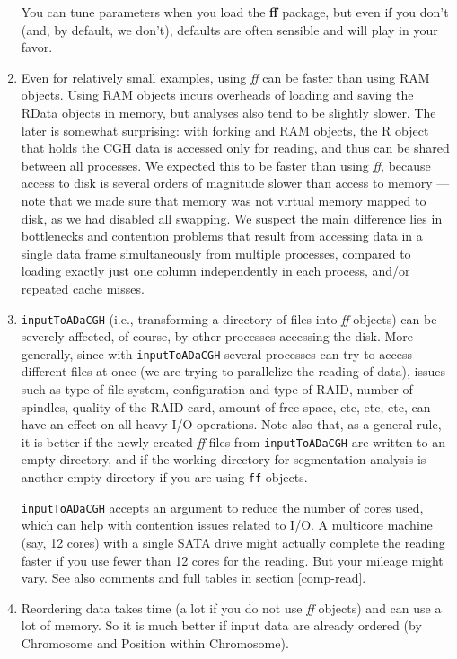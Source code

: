 \documentclass[a4paper,11pt]{article}
\begin{document}
\begin{enumerate}
  You can tune parameters when you load the \textbf{ff} package, but even
  if you don't (and, by default, we don't), defaults are often sensible
  and will play in your favor.
  
\item Even for relatively small examples, using \textit{ff} can be faster
  than using RAM objects. Using RAM objects incurs overheads of loading
  and saving the RData objects in memory, but analyses also tend to be
  slightly slower. The later is somewhat surprising: with forking and RAM
  objects, the R object that holds the CGH data is accessed only for
  reading, and thus can be shared between all processes. We expected this
  to be faster than using \textit{ff}, because access to disk is several
  orders of magnitude slower than access to memory ---note that we made
  sure that memory was not virtual memory mapped to disk, as we had
  disabled all swapping. We suspect the main difference lies in
  bottlenecks and contention problems that result from accessing data in a
  single data frame simultaneously from multiple processes, compared to
  loading exactly just one column independently in each process, and/or
  repeated cache misses.
  
  
\item \texttt{inputToADaCGH} (i.e., transforming a directory of files into
  \textit{ff} objects) can be severely affected, of course, by other
  processes accessing the disk. More generally, since with
  \texttt{inputToADaCGH} several processes can try to access different
  files at once (we are trying to parallelize the reading of data), issues
  such as type of file system, configuration and type of RAID, number of
  spindles, quality of the RAID card, amount of free space, etc, etc, etc,
  can have an effect on all heavy I/O operations.  Note also that, as a
  general rule, it is better if the newly created \textit{ff} files from
  \texttt{inputToADaCGH} are written to an empty directory, and if the
  working directory for segmentation analysis is another empty directory
  if you are using \texttt{ff} objects.

  
  \texttt{inputToADaCGH} accepts an argument to reduce the number of cores used,
  which can help with contention issues related to I/O. A multicore
  machine (say, 12 cores) with a single SATA drive might actually
  complete the reading faster if you use fewer than 12 cores for the
  reading. But your mileage might vary. See also comments and full tables
  in section \ref{comp-read}.

   
\item Reordering data takes time (a lot if you do not use \textit{ff}
  objects) and can use a lot of memory. So it is much better if input data are
  already ordered (by Chromosome and Position within Chromosome).
  
\end{enumerate}



\newpage

\end{document}
